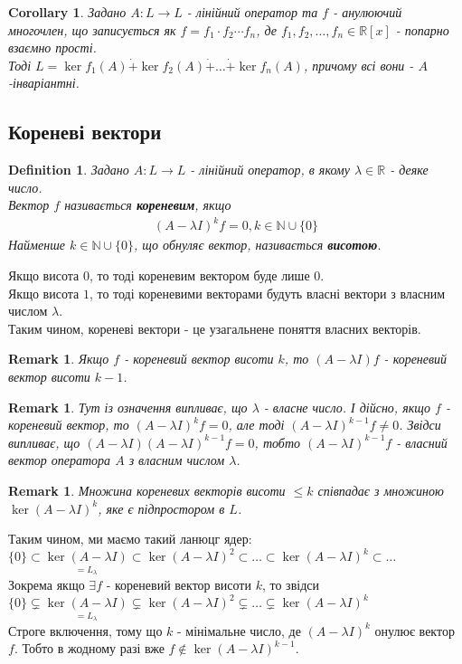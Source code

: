 \documentclass[a4paper, 10pt]{article}
\theoremstyle{theoremdd}
\newtheorem{definition}[theorem]{Definition}
\newtheorem{remark}[theorem]{Remark}
\newtheorem{corollary}[theorem]{Corollary}
\begin{document}
\begin{corollary}
Задано $A: L \to L$ - лінійний оператор та $f$ - анулюючий многочлен, що записується як $f = f_1 \cdot f_2 \cdots f_n$, де $f_1,f_2,\dots,f_n \in \mathbb{R}[x]$ - попарно взаємно прості.\\
Тоді $L = \ker f_1(A) \dot{+} \ker f_2(A) \dot{+} \dots \dot{+} \ker f_n(A)$, причому всі вони - $A$-інваріантні.
\end{corollary}
\fi

\subsection{Кореневі вектори}
\begin{definition}
Задано $A \colon L \to L$ - лінійний оператор, в якому $\lambda \in \mathbb{R}$ - деяке число.\\
Вектор $f$ називається \textbf{кореневим}, якщо
\begin{align*}
(A-\lambda I)^k f = 0, k \in \mathbb{N} \cup \{0\}
\end{align*}
Найменше $k \in \mathbb{N} \cup \{0\}$, що обнуляє вектор, називається \textbf{висотою}.
\end{definition}
\noindent
Якщо висота $0$, то тоді кореневим вектором буде лише $0$.\\
Якщо висота $1$, то тоді кореневими векторами будуть власні вектори з власним числом $\lambda$.\\
Таким чином, кореневі вектори - це узагальнене поняття власних векторів.

\begin{remark}
Якщо $f$ - кореневий вектор висоти $k$, то $(A-\lambda I)f$ - кореневий вектор висоти $k-1$.
\end{remark}

\begin{remark}
Тут із означення випливає, що $\lambda$ - власне число. І дійсно, якщо $f$ - кореневий вектор, то $(A-\lambda I)^k f = 0$, але тоді $(A-\lambda I)^{k-1} f \neq 0$. Звідси випливає, що $(A-\lambda I) (A-\lambda I)^{k-1} f = 0$, тобто $(A-\lambda I)^{k-1} f$ - власний вектор оператора $A$ з власним числом $\lambda$.
\end{remark}

\begin{remark}
Множина кореневих векторів висоти $\leq k$ співпадає з множиною $\ker(A-\lambda I)^k$, яке є підпростором в $L$.
\end{remark}
\noindent
Таким чином, ми маємо такий ланюцг ядер:\\
$\{0\} \subset \underset{= L_\lambda}{\ker(A-\lambda I)} \subset \ker(A-\lambda I)^2 \subset \dots \subset \ker(A-\lambda I)^k \subset \dots$\\
Зокрема якщо $\exists f$ - кореневий вектор висоти $k$, то звідси\\
$\{0\} \subsetneq \underset{= L_\lambda}{\ker(A-\lambda I)} \subsetneq \ker(A-\lambda I)^2 \subsetneq \dots \subsetneq \ker(A-\lambda I)^k$\\
Строге включення, тому що $k$ - мінімальне число, де $(A-\lambda I)^k$ онулює вектор $f$. Тобто в жодному разі вже $f \notin \ker(A-\lambda I)^{k-1}$.
\end{document}
